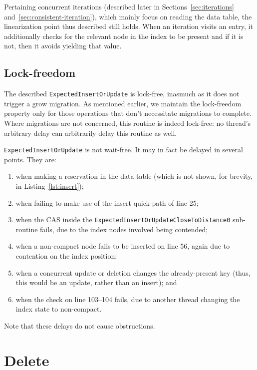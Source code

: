Pertaining concurrent iterations (described later in Sections~\ref{sec:iterations} and~\ref{sec:consistent-iteration}), which mainly focus on reading the data table, the linearization point thus described still holds.
When an iteration visits an entry, it additionally checks for the relevant node in the index to be present and if it is not, then it avoids yielding that value.

\subsection{Lock-freedom}\label{subsec:insert-lock-freedom}

The described \texttt{ExpectedInsertOrUpdate} is lock-free, inasmuch as it does not trigger a grow migration.
As mentioned earlier, we maintain the lock-freedom property only for those operations that don't necessitate migrations to complete.
Where migrations are not concerned, this routine is indeed lock-free: no thread's arbitrary delay can arbitrarily delay this routine as well.

\texttt{ExpectedInsertOrUpdate} is not wait-free.
It may in fact be delayed in several points.
They are:
\begin{enumerate}
    \item when making a reservation in the data table (which is not shown, for brevity, in Listing~\ref{lst:insert});
    \item when failing to make use of the insert quick-path of line 25;
    \item when the CAS inside the \texttt{ExpectedInsertOrUpdateCloseToDistance0} sub-routine fails, due to the index nodes involved being contended;
    \item when a non-compact node fails to be inserted on line 56, again due to contention on the index position;
    \item when a concurrent update or deletion changes the already-present key (thus, this would be an update, rather than an insert); and
    \item when the check on line 103--104 fails, due to another thread changing the index state to non-compact.
\end{enumerate}
Note that these delays do not cause obstructions.





\section{Delete}\label{sec:delete}

